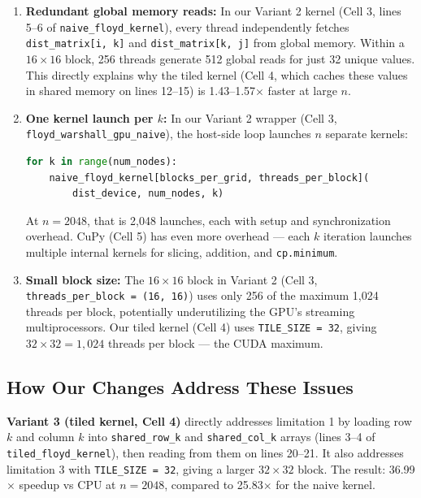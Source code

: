 \documentclass[11pt]{article}
\begin{document}
\begin{enumerate}
  \item \textbf{Redundant global memory reads:} In our Variant 2 kernel (Cell 3, lines 5--6 of \texttt{naive\_floyd\_kernel}), every thread independently fetches \texttt{dist\_matrix[i, k]} and \texttt{dist\_matrix[k, j]} from global memory. Within a $16 \times 16$ block, 256 threads generate 512 global reads for just 32 unique values. This directly explains why the tiled kernel (Cell 4, which caches these values in shared memory on lines 12--15) is 1.43--1.57$\times$ faster at large $n$.

  \item \textbf{One kernel launch per $k$:} In our Variant 2 wrapper (Cell 3, \texttt{floyd\_warshall\_gpu\_naive}), the host-side loop launches $n$ separate kernels:
\begin{lstlisting}[language=Python]
for k in range(num_nodes):
    naive_floyd_kernel[blocks_per_grid, threads_per_block](
        dist_device, num_nodes, k)
\end{lstlisting}
At $n = 2048$, that is 2,048 launches, each with setup and synchronization overhead. CuPy (Cell 5) has even more overhead --- each $k$ iteration launches multiple internal kernels for slicing, addition, and \texttt{cp.minimum}.

  \item \textbf{Small block size:} The $16 \times 16$ block in Variant 2 (Cell 3, \texttt{threads\_per\_block = (16, 16)}) uses only 256 of the maximum 1,024 threads per block, potentially underutilizing the GPU's streaming multiprocessors. Our tiled kernel (Cell 4) uses \texttt{TILE\_SIZE = 32}, giving $32 \times 32 = 1{,}024$ threads per block --- the CUDA maximum.
\end{enumerate}

\subsection{How Our Changes Address These Issues}

\textbf{Variant 3 (tiled kernel, Cell 4)} directly addresses limitation 1 by loading row $k$ and column $k$ into \texttt{shared\_row\_k} and \texttt{shared\_col\_k} arrays (lines 3--4 of \texttt{tiled\_floyd\_kernel}), then reading from them on lines 20--21. It also addresses limitation 3 with \texttt{TILE\_SIZE = 32}, giving a larger $32 \times 32$ block. The result: 36.99$\times$ speedup vs CPU at $n = 2048$, compared to 25.83$\times$ for the naive kernel.
\end{document}
